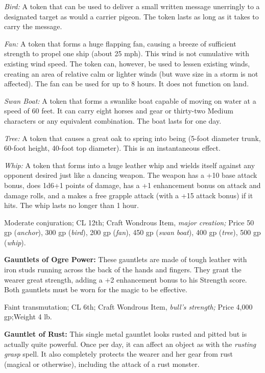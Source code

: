\textit{Bird: }A token that can be used to deliver a small written message unerringly 
to a designated target as would a carrier pigeon. The token lasts as long as it 
takes to carry the message.

\textit{Fan: }A token that forms a huge flapping fan, causing a breeze of sufficient 
strength to propel one ship (about 25 mph). This wind is not cumulative with existing 
wind speed. The token can, however, be used to lessen existing winds, creating 
an area of relative calm or lighter winds (but wave size in a storm is not affected). 
The fan can be used for up to 8 hours. It does not function on land.

\textit{Swan Boat: }A token that forms a swanlike boat capable of moving on water 
at a speed of 60 feet. It can carry eight horses and gear or thirty-two Medium 
characters or any equivalent combination. The boat lasts for one day.

\textit{Tree: }A token that causes a great oak to spring into being (5-foot diameter 
trunk, 60-foot height, 40-foot top diameter). This is an instantaneous effect.

\textit{Whip: }A token that forms into a huge leather whip and wields itself against 
any opponent desired just like a dancing weapon. The weapon has a +10 base attack 
bonus, does 1d6+1 points of damage, has a +1 enhancement bonus on attack and damage 
rolls, and a makes a free grapple attack (with a +15 attack bonus) if it hits. 
The whip lasts no longer than 1 hour.

Moderate conjuration; CL 12th; Craft Wondrous Item, \textit{major creation; }Price 
50 gp (\textit{anchor}), 300 gp (\textit{bird}), 200 gp (\textit{fan}), 450 gp 
(\textit{swan boat}), 400 gp (\textit{tree}), 500 gp (\textit{whip}).

\textbf{Gauntlets of Ogre Power: }These gauntlets are made of tough leather with 
iron studs running across the back of the hands and fingers. They grant the wearer 
great strength, adding a +2 enhancement bonus to his Strength score. Both gauntlets 
must be worn for the magic to be effective.

Faint transmutation; CL 6th; Craft Wondrous Item, \textit{bull's strength; }Price 
4,000 gp;Weight 4 lb.

\textbf{Gauntlet of Rust:} This single metal gauntlet looks rusted and pitted but 
is actually quite powerful. Once per day, it can affect an object as with the \textit{rusting 
grasp }spell. It also completely protects the wearer and her gear from rust (magical 
or otherwise), including the attack of a rust monster.

